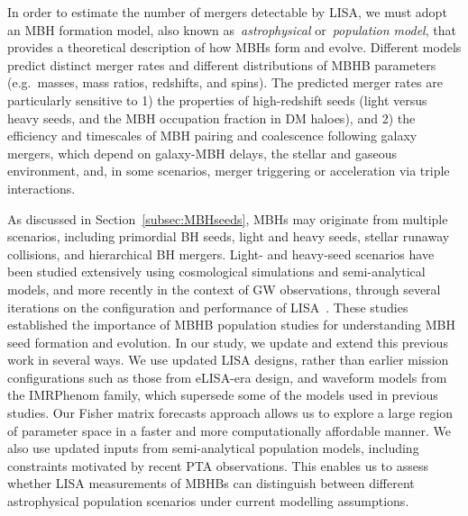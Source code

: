 \documentclass[a4paper,12pt]{article}
\begin{document}
In order to estimate the number of mergers detectable by LISA, we must adopt an MBH formation model, also known as~\textit{astrophysical} or~\textit{population model}, that provides a theoretical description of how MBHs form and evolve. 
Different models predict distinct merger rates and different distributions of MBHB parameters (e.g.\ masses, mass ratios, redshifts, and spins). 
The predicted merger rates are particularly sensitive to 1) the properties of high-redshift seeds (light versus heavy seeds, and the MBH occupation fraction in DM haloes)\cite{sesana2007imprint,klein2016science,barausse2012evolution}, and 2) the efficiency and timescales of MBH pairing and coalescence following galaxy mergers, which depend on galaxy-MBH delays, the stellar and gaseous environment, and, in some scenarios, merger triggering or acceleration via triple interactions\cite{sesana2007imprint,klein2016science,bonetti2018post}.

As discussed in Section~\ref{subsec:MBHseeds}, MBHs may originate from multiple scenarios, including primordial BH seeds, light and heavy seeds, stellar runaway collisions, and hierarchical BH mergers. 
Light- and heavy-seed scenarios have been studied extensively using cosmological simulations and semi-analytical models, and more recently in the context of GW observations, through several iterations on the configuration and performance of LISA~\cite{sesana2011reconstructing,klein2016science}. These studies established the importance of MBHB population studies for understanding MBH seed formation and evolution. In our study, we update and extend this previous work in several ways. We use updated LISA designs, rather than earlier mission configurations such as those from eLISA-era design, and waveform models from the IMRPhenom family, which supersede some of the models used in previous studies. Our Fisher matrix forecasts approach allows us to explore a large region of parameter space in a faster and more computationally affordable manner. We also use updated inputs from semi-analytical population models, including constraints motivated by recent PTA observations. This enables us to assess whether LISA measurements of MBHBs can distinguish between different astrophysical population scenarios under current modelling assumptions.
\end{document}

